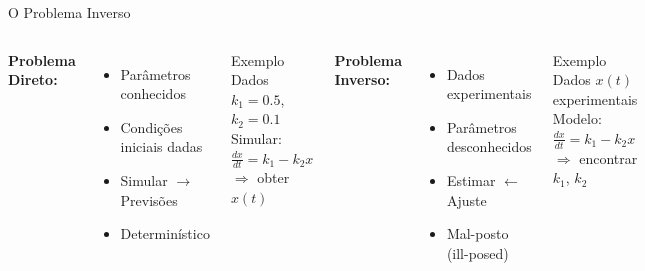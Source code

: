 \begin{frame}{O Problema Inverso}
\begin{columns}
\textbf{Problema Direto:}
\begin{itemize}\small
    \item Parâmetros conhecidos
    \item Condições iniciais dadas
    \item Simular $\rightarrow$ Previsões
    \item Determinístico
\end{itemize}

\vspace{0.08cm}

\begin{exampleblock}{Exemplo}\small
Dados $k_1=0.5$, $k_2=0.1$\\
Simular: $\frac{dx}{dt} = k_1 - k_2 x$\\
$\Rightarrow$ obter $x(t)$
\end{exampleblock}

\textbf{Problema Inverso:}
\begin{itemize}\small
    \item Dados experimentais
    \item Parâmetros desconhecidos
    \item Estimar $\leftarrow$ Ajuste
    \item Mal-posto (ill-posed)
\end{itemize}

\vspace{0.08cm}

\begin{alertblock}{Exemplo}\small
Dados $x(t)$ experimentais\\
Modelo: $\frac{dx}{dt} = k_1 - k_2 x$\\
$\Rightarrow$ encontrar $k_1$, $k_2$
\end{alertblock}
\end{columns}

\vspace{0.1cm}

\end{frame}

